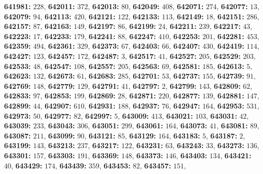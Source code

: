 \textsf{\bfseries 641981:} $228$, \textsf{\bfseries 642011:} $372$, \textsf{\bfseries 642013:} $80$, \textsf{\bfseries 642049:} $408$, \textsf{\bfseries 642071:} $274$, \textsf{\bfseries 642077:} $13$, \textsf{\bfseries 642079:} $94$, \textsf{\bfseries 642113:} $420$, \textsf{\bfseries 642121:} $122$, \textsf{\bfseries 642133:} $113$, \textsf{\bfseries 642149:} $18$, \textsf{\bfseries 642151:} $286$, \textsf{\bfseries 642157:} $87$, \textsf{\bfseries 642163:} $149$, \textsf{\bfseries 642197:} $86$, \textsf{\bfseries 642199:} $24$, \textsf{\bfseries 642211:} $239$, \textsf{\bfseries 642217:} $43$, \textsf{\bfseries 642223:} $17$, \textsf{\bfseries 642233:} $179$, \textsf{\bfseries 642241:} $88$, \textsf{\bfseries 642247:} $410$, \textsf{\bfseries 642253:} $201$, \textsf{\bfseries 642281:} $453$, \textsf{\bfseries 642359:} $494$, \textsf{\bfseries 642361:} $329$, \textsf{\bfseries 642373:} $67$, \textsf{\bfseries 642403:} $66$, \textsf{\bfseries 642407:} $430$, \textsf{\bfseries 642419:} $114$, \textsf{\bfseries 642427:} $123$, \textsf{\bfseries 642457:} $172$, \textsf{\bfseries 642487:} $3$, \textsf{\bfseries 642517:} $41$, \textsf{\bfseries 642527:} $205$, \textsf{\bfseries 642529:} $203$, \textsf{\bfseries 642533:} $48$, \textsf{\bfseries 642547:} $108$, \textsf{\bfseries 642557:} $205$, \textsf{\bfseries 642563:} $69$, \textsf{\bfseries 642581:} $185$, \textsf{\bfseries 642613:} $5$, \textsf{\bfseries 642623:} $132$, \textsf{\bfseries 642673:} $61$, \textsf{\bfseries 642683:} $285$, \textsf{\bfseries 642701:} $53$, \textsf{\bfseries 642737:} $155$, \textsf{\bfseries 642739:} $91$, \textsf{\bfseries 642769:} $148$, \textsf{\bfseries 642779:} $129$, \textsf{\bfseries 642791:} $41$, \textsf{\bfseries 642797:} $2$, \textsf{\bfseries 642799:} $143$, \textsf{\bfseries 642809:} $62$, \textsf{\bfseries 642833:} $97$, \textsf{\bfseries 642853:} $199$, \textsf{\bfseries 642869:} $28$, \textsf{\bfseries 642871:} $220$, \textsf{\bfseries 642877:} $139$, \textsf{\bfseries 642881:} $147$, \textsf{\bfseries 642899:} $44$, \textsf{\bfseries 642907:} $610$, \textsf{\bfseries 642931:} $188$, \textsf{\bfseries 642937:} $76$, \textsf{\bfseries 642947:} $164$, \textsf{\bfseries 642953:} $531$, \textsf{\bfseries 642973:} $50$, \textsf{\bfseries 642977:} $82$, \textsf{\bfseries 642997:} $5$, \textsf{\bfseries 643009:} $413$, \textsf{\bfseries 643021:} $103$, \textsf{\bfseries 643031:} $42$, \textsf{\bfseries 643039:} $233$, \textsf{\bfseries 643043:} $306$, \textsf{\bfseries 643051:} $299$, \textsf{\bfseries 643061:} $164$, \textsf{\bfseries 643073:} $41$, \textsf{\bfseries 643081:} $89$, \textsf{\bfseries 643087:} $211$, \textsf{\bfseries 643099:} $90$, \textsf{\bfseries 643121:} $85$, \textsf{\bfseries 643129:} $164$, \textsf{\bfseries 643183:} $5$, \textsf{\bfseries 643187:} $2$, \textsf{\bfseries 643199:} $143$, \textsf{\bfseries 643213:} $237$, \textsf{\bfseries 643217:} $122$, \textsf{\bfseries 643231:} $63$, \textsf{\bfseries 643243:} $33$, \textsf{\bfseries 643273:} $136$, \textsf{\bfseries 643301:} $157$, \textsf{\bfseries 643303:} $191$, \textsf{\bfseries 643369:} $148$, \textsf{\bfseries 643373:} $146$, \textsf{\bfseries 643403:} $134$, \textsf{\bfseries 643421:} $40$, \textsf{\bfseries 643429:} $174$, \textsf{\bfseries 643439:} $359$, \textsf{\bfseries 643453:} $82$, \textsf{\bfseries 643457:} $151$, 
